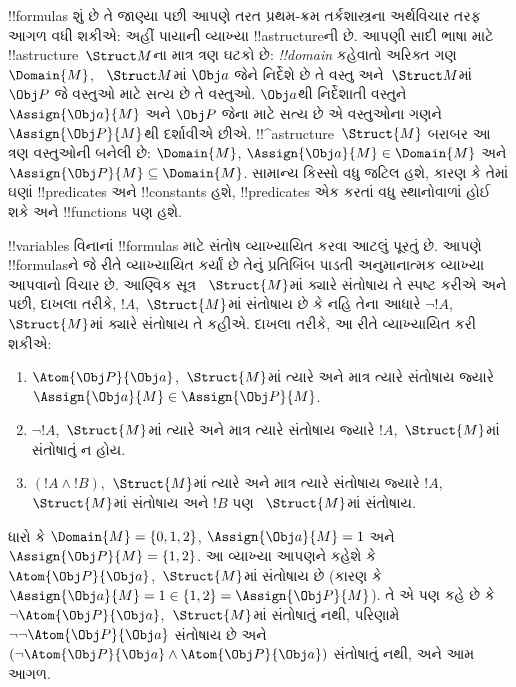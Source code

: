 \documentclass[../../../include/open-logic-section]{subfiles}
\begin{document}


!!{formula}s શું છે તે જાણ્યા પછી આપણે તરત પ્રથમ-ક્રમ તર્કશાસ્ત્રના
અર્થવિચાર તરફ આગળ વધી શકીએ: અહીં પાયાની વ્યાખ્યા !!a{structure}ની
છે. આપણી સાદી ભાષા માટે !!a{structure}~$\Struct M$ના માત્ર ત્રણ ઘટકો
છે: \emph{!!{domain}} કહેવાતો અરિક્ત ગણ~$\Domain{M}$,
~$\Struct M$માં $\Obj a$ જેને નિર્દેશે છે તે વસ્તુ અને~$\Struct M$માં
$\Obj P$ જે વસ્તુઓ માટે સત્ય છે તે વસ્તુઓ. $\Obj a$થી નિર્દેશાતી
વસ્તુને~$\Assign{\Obj a}{M}$ અને $\Obj P$ જેના માટે સત્ય છે એ
વસ્તુઓના ગણને~$\Assign{\Obj P}{M}$થી દર્શાવીએ છીએ.
!!^a{structure}~$\Struct{M}$ બરાબર આ ત્રણ વસ્તુઓની બનેલી છે:
$\Domain{M}$, $\Assign{\Obj a}{M} \in \Domain{M}$ અને
$\Assign{\Obj P}{M} \subseteq \Domain{M}$. સામાન્ય કિસ્સો વધુ જટિલ
હશે, કારણ કે તેમાં ઘણાં !!{predicate}s અને !!{constant}s હશે,
!!{predicate}s એક કરતાં વધુ સ્થાનોવાળાં હોઈ શકે અને !!{function}s પણ
હશે.

!!{variable}s વિનાનાં !!{formula}s માટે સંતોષ વ્યાખ્યાયિત કરવા આટલું
પૂરતું છે. આપણે !!{formula}sને જે રીતે વ્યાખ્યાયિત કર્યાં છે તેનું
પ્રતિબિંબ પાડતી અનુમાનાત્મક વ્યાખ્યા આપવાનો વિચાર છે. આણ્વિક સૂત્ર
~$\Struct{M}$માં ક્યારે સંતોષાય તે સ્પષ્ટ કરીએ અને પછી, દાખલા તરીકે,
$!A$,~$\Struct{M}$માં સંતોષાય છે કે નહિ તેના આધારે $\lnot !A$,
~$\Struct{M}$માં ક્યારે સંતોષાય તે કહીએ. દાખલા તરીકે, આ રીતે
વ્યાખ્યાયિત કરી શકીએ:
\begin{enumerate}
  \item $\Atom{\Obj P}{\Obj a}$,~$\Struct{M}$માં ત્યારે અને માત્ર
  ત્યારે સંતોષાય જ્યારે $\Assign{\Obj a}{M} \in \Assign{\Obj P}{M}$.
  \item $\lnot !A$,~$\Struct{M}$માં ત્યારે અને માત્ર ત્યારે સંતોષાય
  જ્યારે $!A$,~$\Struct{M}$માં સંતોષાતું ન હોય.
  \item $(!A \land !B)$,~$\Struct{M}$માં ત્યારે અને માત્ર ત્યારે
  સંતોષાય જ્યારે $!A$,~$\Struct{M}$માં સંતોષાય અને $!B$ પણ
  ~$\Struct{M}$માં સંતોષાય.
\end{enumerate}
ધારો કે $\Domain{M} = \{0, 1, 2\}$, $\Assign{\Obj a}{M} = 1$ અને
$\Assign{\Obj P}{M} = \{1, 2\}$. આ વ્યાખ્યા આપણને કહેશે કે
$\Atom{\Obj P}{\Obj a}$,~$\Struct{M}$માં સંતોષાય છે (કારણ કે
$\Assign{\Obj a}{M} = 1 \in \{1,2\} = \Assign{\Obj P}{M}$). તે એ પણ
કહે છે કે $\lnot \Atom{\Obj P}{\Obj a}$,~$\Struct{M}$માં સંતોષાતું
નથી, પરિણામે $\lnot\lnot \Atom{\Obj P}{\Obj a}$ સંતોષાય છે અને
$(\lnot \Atom{\Obj P}{\Obj a} \land \Atom{\Obj P}{\Obj a})$
સંતોષાતું નથી, અને આમ આગળ.
\end{document}
